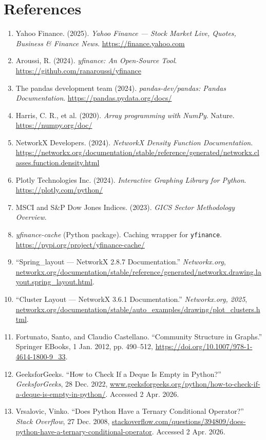 \documentclass[fontsize=11pt]{article}
\begin{document}
\section*{References}
\begin{enumerate}
    \item Yahoo Finance. (2025). \textit{Yahoo Finance — Stock Market Live, Quotes, Business \& Finance News}. \url{https://finance.yahoo.com}
    \item Aroussi, R. (2024). \textit{yfinance: An Open-Source Tool}. \url{https://github.com/ranaroussi/yfinance}
    \item The pandas development team (2024). \textit{pandas-dev/pandas: Pandas Documentation}. \url{https://pandas.pydata.org/docs/}
    \item Harris, C. R., et al. (2020). \textit{Array programming with NumPy}. Nature. \url{https://numpy.org/doc/}
    \item NetworkX Developers. (2024). \textit{NetworkX Density Function Documentation}. \url{https://networkx.org/documentation/stable/reference/generated/networkx.classes.function.density.html}
    \item Plotly Technologies Inc. (2024). \textit{Interactive Graphing Library for Python}. \url{https://plotly.com/python/}
    \item MSCI and S\&P Dow Jones Indices. (2023). \textit{GICS Sector Methodology Overview}.
    \item \textit{yfinance-cache} (Python package). Caching wrapper for \texttt{yfinance}. \url{https://pypi.org/project/yfinance-cache/}
    \item  “Spring\_layout — NetworkX 2.8.7 Documentation.” \textit{Networkx.org}, \url{networkx.org/documentation/stable/reference/generated/networkx.drawing.layout.spring_layout.html}.
    \item “Cluster Layout — NetworkX 3.6.1 Documentation.” \textit{Networkx.org, 2025}, \url{networkx.org/documentation/stable/auto_examples/drawing/plot_clusters.html}.
    \item Fortunato, Santo, and Claudio Castellano. “Community Structure in Graphs.” Springer EBooks, 1 Jan. 2012, pp. 490–512, \url{https://doi.org/10.1007/978-1-4614-1800-9_33}.
    \item GeeksforGeeks. “How to Check If a Deque Is Empty in Python?” \textit{GeeksforGeeks}, 28 Dec. 2022, \url{www.geeksforgeeks.org/python/how-to-check-if-a-deque-is-empty-in-python/}. Accessed 2 Apr. 2026.
    \item Vrsalovic, Vinko. “Does Python Have a Ternary Conditional Operator?” \textit{Stack Overflow}, 27 Dec. 2008, \url{stackoverflow.com/questions/394809/does-python-have-a-ternary-conditional-operator}. Accessed 2 Apr. 2026.

\end{enumerate}
\end{document}
